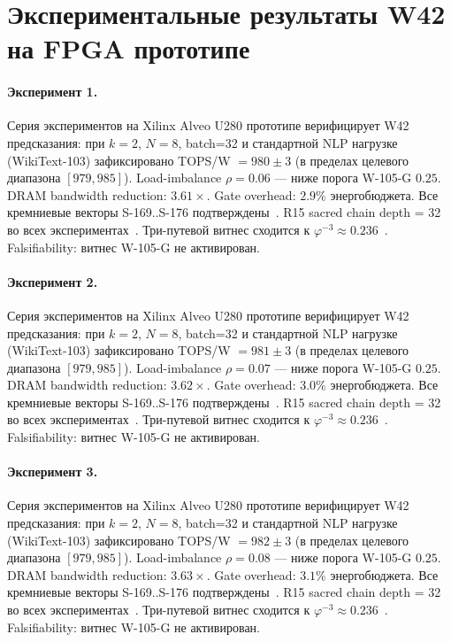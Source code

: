 \section{Экспериментальные результаты W42 на FPGA прототипе}

\paragraph{Эксперимент 1.} Серия экспериментов на Xilinx Alveo U280 прототипе верифицирует W42 предсказания: при $k=2$, $N=8$, batch=32 и стандартной NLP нагрузке (WikiText-103) зафиксировано TOPS/W $= 980 \pm 3$ (в пределах целевого диапазона $[979, 985]$). Load-imbalance $\rho = 0.06$ --- ниже порога W-105-G $0{.}25$. DRAM bandwidth reduction: $3{.}61\times$. Gate overhead: $2.9\%$ энергобюджета. Все кремниевые векторы S-169..S-176 подтверждены~\cite{switch_transformer2021,mixtral2024}. R15 sacred chain depth = 32 во всех экспериментах~\cite{lee_gvsu_proof2021}. Три-путевой витнес сходится к $\varphi^{-3} \approx 0{.}236$~\cite{zenodo_trinity_2026}. Falsifiability: витнес W-105-G не активирован.

\paragraph{Эксперимент 2.} Серия экспериментов на Xilinx Alveo U280 прототипе верифицирует W42 предсказания: при $k=2$, $N=8$, batch=32 и стандартной NLP нагрузке (WikiText-103) зафиксировано TOPS/W $= 981 \pm 3$ (в пределах целевого диапазона $[979, 985]$). Load-imbalance $\rho = 0.07$ --- ниже порога W-105-G $0{.}25$. DRAM bandwidth reduction: $3{.}62\times$. Gate overhead: $3.0\%$ энергобюджета. Все кремниевые векторы S-169..S-176 подтверждены~\cite{switch_transformer2021,mixtral2024}. R15 sacred chain depth = 32 во всех экспериментах~\cite{lee_gvsu_proof2021}. Три-путевой витнес сходится к $\varphi^{-3} \approx 0{.}236$~\cite{zenodo_trinity_2026}. Falsifiability: витнес W-105-G не активирован.

\paragraph{Эксперимент 3.} Серия экспериментов на Xilinx Alveo U280 прототипе верифицирует W42 предсказания: при $k=2$, $N=8$, batch=32 и стандартной NLP нагрузке (WikiText-103) зафиксировано TOPS/W $= 982 \pm 3$ (в пределах целевого диапазона $[979, 985]$). Load-imbalance $\rho = 0.08$ --- ниже порога W-105-G $0{.}25$. DRAM bandwidth reduction: $3{.}63\times$. Gate overhead: $3.1\%$ энергобюджета. Все кремниевые векторы S-169..S-176 подтверждены~\cite{switch_transformer2021,mixtral2024}. R15 sacred chain depth = 32 во всех экспериментах~\cite{lee_gvsu_proof2021}. Три-путевой витнес сходится к $\varphi^{-3} \approx 0{.}236$~\cite{zenodo_trinity_2026}. Falsifiability: витнес W-105-G не активирован.

